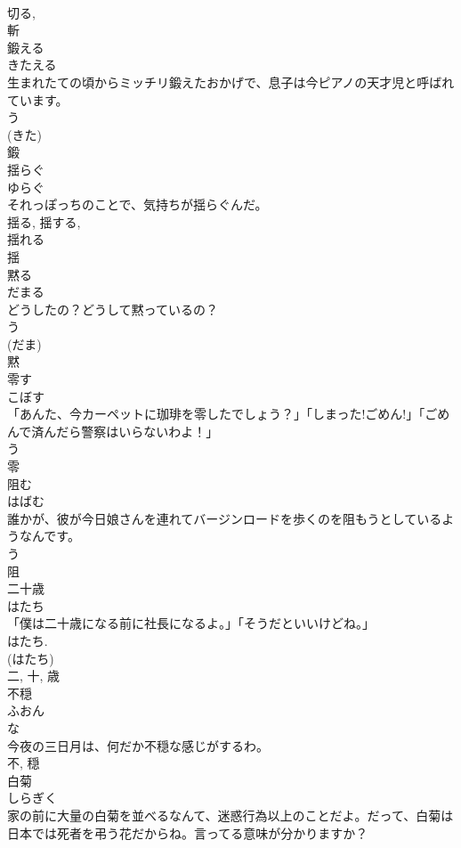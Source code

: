 \documentclass[8pt]{extreport}
\begin{document}
\begin{CJK}{UTF8}{min}
\\	切る, 
\\	斬	
\\	鍛える	
\\	きたえる	
\\	生まれたての頃からミッチリ鍛えたおかげで、息子は今ピアノの天才児と呼ばれています。	
\\	う 
\\	(きた) 
\\	鍛	
\\	揺らぐ	
\\	ゆらぐ	
\\	それっぽっちのことで、気持ちが揺らぐんだ。	
\\	揺る, 揺する, 
\\	揺れる 
\\	揺	
\\	黙る	
\\	だまる	
\\	どうしたの？どうして黙っているの？	
\\	う 
\\	(だま) 
\\	黙	
\\	零す	
\\	こぼす	
\\	「あんた、今カーペットに珈琲を零したでしょう？」「しまった!ごめん!」「ごめんで済んだら警察はいらないわよ！」	
\\	う 
\\	零	
\\	阻む	
\\	はばむ	
\\	誰かが、彼が今日娘さんを連れてバージンロードを歩くのを阻もうとしているようなんです。	
\\	う 
\\	阻	
\\	二十歳	
\\	はたち	
\\	「僕は二十歳になる前に社長になるよ。」「そうだといいけどね。」	
\\	はたち. 
\\	(はたち) 
\\	二, 十, 歳	
\\	不穏	
\\	ふおん	
\\	な 
\\	今夜の三日月は、何だか不穏な感じがするわ。	
\\	不, 穏	
\\	白菊	
\\	しらぎく	
\\	家の前に大量の白菊を並べるなんて、迷惑行為以上のことだよ。だって、白菊は日本では死者を弔う花だからね。言ってる意味が分かりますか？	

\end{CJK}
\end{document}
